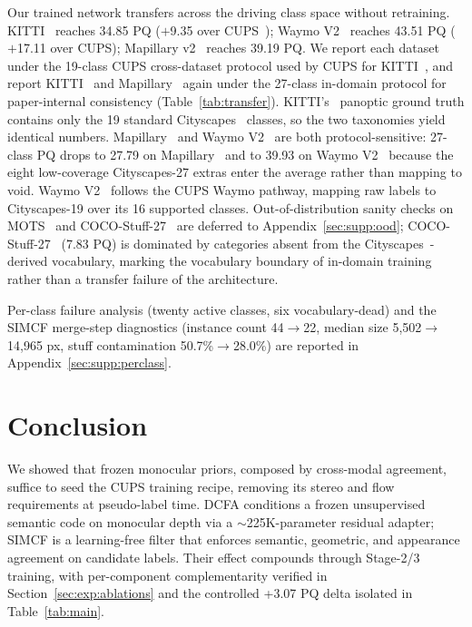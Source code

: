 \documentclass{article}
\begin{document}
Our trained network transfers across the driving class space without retraining. KITTI~\cite{geiger2012kitti} reaches 34.85 PQ ($+$9.35 over CUPS~\cite{hahn2025cups}); Waymo V2~\cite{sun2020waymo} reaches 43.51 PQ ($+$17.11 over CUPS); Mapillary v2~\cite{neuhold2017mapillary} reaches 39.19 PQ. We report each dataset under the 19-class CUPS cross-dataset protocol used by CUPS for KITTI~\cite{geiger2012kitti}, and report KITTI~\cite{geiger2012kitti} and Mapillary~\cite{neuhold2017mapillary} again under the 27-class in-domain protocol for paper-internal consistency (Table~\ref{tab:transfer}). KITTI's~\cite{geiger2012kitti} panoptic ground truth contains only the 19 standard Cityscapes~\cite{cordts2016cityscapes} classes, so the two taxonomies yield identical numbers. Mapillary~\cite{neuhold2017mapillary} and Waymo V2~\cite{sun2020waymo} are both protocol-sensitive: 27-class PQ drops to 27.79 on Mapillary~\cite{neuhold2017mapillary} and to 39.93 on Waymo V2~\cite{sun2020waymo} because the eight low-coverage Cityscapes-27 extras enter the average rather than mapping to void. Waymo V2~\cite{sun2020waymo} follows the CUPS Waymo pathway, mapping raw labels to Cityscapes-19 over its 16 supported classes. Out-of-distribution sanity checks on MOTS~\cite{voigtlaender2019mots} and COCO-Stuff-27~\cite{caesar2018coco} are deferred to Appendix~\ref{sec:supp:ood}; COCO-Stuff-27~\cite{caesar2018coco} (7.83 PQ) is dominated by categories absent from the Cityscapes~\cite{cordts2016cityscapes}-derived vocabulary, marking the vocabulary boundary of in-domain training rather than a transfer failure of the architecture.

Per-class failure analysis (twenty active classes, six vocabulary-dead) and the SIMCF merge-step diagnostics (instance count 44$\to$22, median size 5{,}502$\to$14{,}965 px, stuff contamination 50.7\%$\to$28.0\%) are reported in Appendix~\ref{sec:supp:perclass}.


\FloatBarrier
\section{Conclusion}
\label{sec:conclusion}

We showed that frozen monocular priors, composed by cross-modal agreement, suffice to seed the CUPS training recipe, removing its stereo and flow requirements at pseudo-label time. DCFA conditions a frozen unsupervised semantic code on monocular depth via a $\sim$225K-parameter residual adapter; SIMCF is a learning-free filter that enforces semantic, geometric, and appearance agreement on candidate labels. Their effect compounds through Stage-2/3 training, with per-component complementarity verified in Section~\ref{sec:exp:ablations} and the controlled +3.07 PQ delta isolated in Table~\ref{tab:main}.
\end{document}
